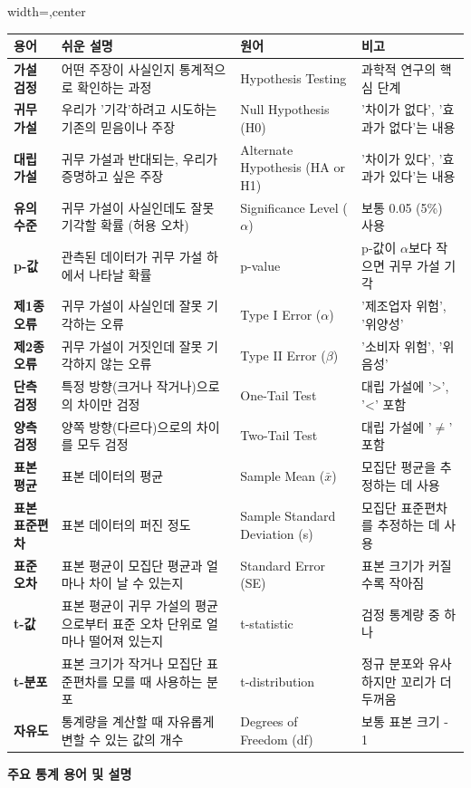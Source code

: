 \documentclass[11pt,a4paper]{book}
\providecommand{\captionof}[2]{\textbf{#2}}
\theoremstyle{definition}
\begin{document}
\begin{adjustbox}{width=\textwidth,center}
\begin{tabular}{llll}
\toprule
\textbf{용어} & \textbf{쉬운 설명} & \textbf{원어} & \textbf{비고} \\
\midrule
\textbf{가설 검정} & 어떤 주장이 사실인지 통계적으로 확인하는 과정 & Hypothesis Testing & 과학적 연구의 핵심 단계 \\
\textbf{귀무 가설} & 우리가 '기각'하려고 시도하는 기존의 믿음이나 주장 & Null Hypothesis (H0) & '차이가 없다', '효과가 없다'는 내용 \\
\textbf{대립 가설} & 귀무 가설과 반대되는, 우리가 증명하고 싶은 주장 & Alternate Hypothesis (HA or H1) & '차이가 있다', '효과가 있다'는 내용 \\
\textbf{유의 수준} & 귀무 가설이 사실인데도 잘못 기각할 확률 (허용 오차) & Significance Level ($\alpha$) & 보통 0.05 (5\%) 사용 \\
\textbf{p-값} & 관측된 데이터가 귀무 가설 하에서 나타날 확률 & p-value & p-값이 $\alpha$보다 작으면 귀무 가설 기각 \\
\textbf{제1종 오류} & 귀무 가설이 사실인데 잘못 기각하는 오류 & Type I Error ($\alpha$) & '제조업자 위험', '위양성' \\
\textbf{제2종 오류} & 귀무 가설이 거짓인데 잘못 기각하지 않는 오류 & Type II Error ($\beta$) & '소비자 위험', '위음성' \\
\textbf{단측 검정} & 특정 방향(크거나 작거나)으로의 차이만 검정 & One-Tail Test & 대립 가설에 '>', '<' 포함 \\
\textbf{양측 검정} & 양쪽 방향(다르다)으로의 차이를 모두 검정 & Two-Tail Test & 대립 가설에 '$\ne$' 포함 \\
\textbf{표본 평균} & 표본 데이터의 평균 & Sample Mean ($\bar{x}$) & 모집단 평균을 추정하는 데 사용 \\
\textbf{표본 표준편차} & 표본 데이터의 퍼진 정도 & Sample Standard Deviation (s) & 모집단 표준편차를 추정하는 데 사용 \\
\textbf{표준 오차} & 표본 평균이 모집단 평균과 얼마나 차이 날 수 있는지 & Standard Error (SE) & 표본 크기가 커질수록 작아짐 \\
\textbf{t-값} & 표본 평균이 귀무 가설의 평균으로부터 표준 오차 단위로 얼마나 떨어져 있는지 & t-statistic & 검정 통계량 중 하나 \\
\textbf{t-분포} & 표본 크기가 작거나 모집단 표준편차를 모를 때 사용하는 분포 & t-distribution & 정규 분포와 유사하지만 꼬리가 더 두꺼움 \\
\textbf{자유도} & 통계량을 계산할 때 자유롭게 변할 수 있는 값의 개수 & Degrees of Freedom (df) & 보통 표본 크기 - 1 \\
\bottomrule
\end{tabular}
\end{adjustbox}
\captionof{table}{주요 통계 용어 및 설명}
\label{tab:glossary}
\end{document}
